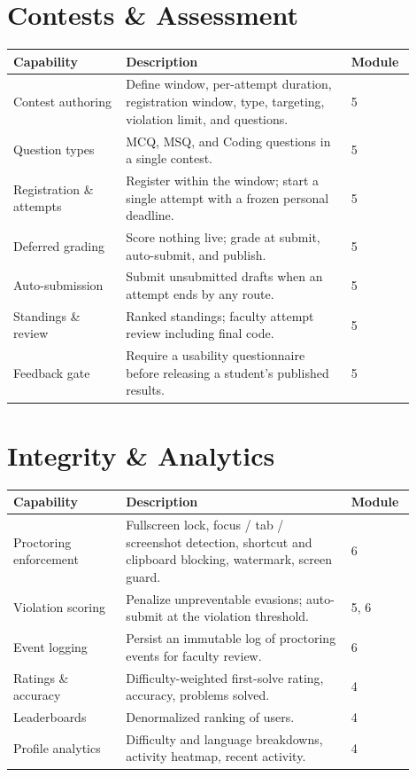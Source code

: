 \documentclass[12pt,a4paper,oneside]{report}
\begin{document}
\section{Contests \& Assessment}
\begin{longtable}{@{}p{0.26\linewidth} p{0.52\linewidth} p{0.12\linewidth}@{}}
\toprule
\textbf{Capability} & \textbf{Description} & \textbf{Module}\\
\midrule
\endhead
Contest authoring & Define window, per-attempt duration, registration window, type, targeting, violation limit, and questions. & 5\\
Question types & MCQ, MSQ, and Coding questions in a single contest. & 5\\
Registration \& attempts & Register within the window; start a single attempt with a frozen personal deadline. & 5\\
Deferred grading & Score nothing live; grade at submit, auto-submit, and publish. & 5\\
Auto-submission & Submit unsubmitted drafts when an attempt ends by any route. & 5\\
Standings \& review & Ranked standings; faculty attempt review including final code. & 5\\
Feedback gate & Require a usability questionnaire before releasing a student's published results. & 5\\
\bottomrule
\end{longtable}

\section{Integrity \& Analytics}
\begin{longtable}{@{}p{0.26\linewidth} p{0.52\linewidth} p{0.12\linewidth}@{}}
\toprule
\textbf{Capability} & \textbf{Description} & \textbf{Module}\\
\midrule
\endhead
Proctoring enforcement & Fullscreen lock, focus / tab / screenshot detection, shortcut and clipboard blocking, watermark, screen guard. & 6\\
Violation scoring & Penalize unpreventable evasions; auto-submit at the violation threshold. & 5, 6\\
Event logging & Persist an immutable log of proctoring events for faculty review. & 6\\
Ratings \& accuracy & Difficulty-weighted first-solve rating, accuracy, problems solved. & 4\\
Leaderboards & Denormalized ranking of users. & 4\\
Profile analytics & Difficulty and language breakdowns, activity heatmap, recent activity. & 4\\
\bottomrule
\end{longtable}
\end{document}
